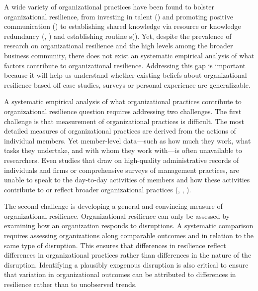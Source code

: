 \documentclass[12pt,notitlepage]{article}
\begin{document}
A wide variety of organizational practices have been found to bolster organizational resilience, from investing in talent (\cite{maor_building_2022}) and promoting positive communication (\cite{luthans_psychological_2006}) to establishing shared knowledge via resource or knowledge redundancy (\cite{sheffi_supply_2005}, \cite{rashid_systematic_2019}) and establishing routine s(\cite{suarez_building_2020}). 
Yet, despite the prevalence of research on organizational resilience and the high levels among the broader business community, there does not exist an systematic empirical analysis of what factors contribute to organizational resilience. 
Addressing this gap is important because it will help us understand whether existing beliefs about organizational resilience based off case studies, surveys or personal experience are generalizable.


A systematic empirical analysis of what organizational practices contribute to organizational resilience question requires addressing two challenges.
The first challenge is that measurement of organizational practices is difficult. 
The most detailed measures of organizational practices are derived from the actions of individual members. 
Yet member-level data—such as how much they work, what tasks they undertake, and with whom they work with—is often unavailable to researchers. 
Even studies that draw on high-quality administrative records of individuals and firms or comprehensive surveys of management practices, are unable to speak to the day-to-day activities of members and how these activities contribute to or reflect broader organizational practices (\cite{bloom_management_2012}, \cite{jaravel_team-specific_2018}, \cite{jager_how_2022}). 

The second challenge is developing a general and convincing measure of organizational resilience. 
Organizational resilience can only be assessed by examining how an organization responds to disruptions. 
A systematic comparison requires assessing organizations along comparable outcomes and in relation to the same type of disruption. 
This ensures that differences in resilience reflect differences in organizational practices rather than differences in the nature of the disruption. 
Identifying a plausibly exogenous disruption is also critical to ensure that variation in organizational outcomes can be attributed to differences in resilience rather than to unobserved trends.
\end{document}
